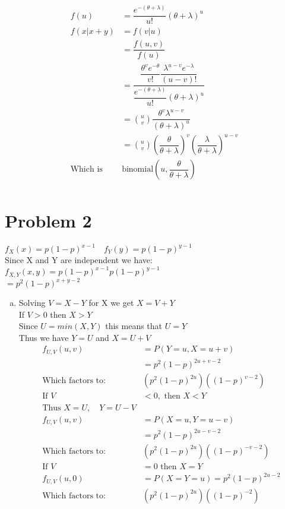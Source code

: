 \documentclass{article}
\begin{document}
\begin{flushleft}
\begin{align*}
f(u)&=\dfrac{e^{-(\theta+\lambda)}}{u!}(\theta+\lambda)^u\\
f(x|x+y)&= f(v|u)\\
&=\dfrac{f(u,v)}{f(u)}\\
&=\dfrac{\dfrac{\theta^v e^{-\theta}}{v!} \dfrac{\lambda^{u-v} e^{-\lambda}}{(u-v)!}}{\dfrac{e^{-(\theta+\lambda)}}{u!}(\theta+\lambda)^u}\\
&={u \choose v}\dfrac{\theta^v \lambda^{u-v}}{(\theta+\lambda)^u}\\
&={u \choose v}\left(\dfrac{\theta}{\theta+\lambda}\right)^{v} \left(\dfrac{\lambda}{\theta+\lambda}\right)^{u-v}\\
\text{Which is }& \text{binomial}\left(u,\dfrac{\theta}{\theta+\lambda}\right)\\
\end{align*}
\section*{Problem 2}
$f_X(x)=p(1-p)^{x-1} \quad f_Y(y)=p(1-p)^{y-1}$\\
Since X and Y are independent we have:\\
$f_{X,Y}(x,y)=p(1-p)^{x-1}p(1-p)^{y-1}$\\
$=p^2(1-p)^{x+y-2}$\\
\begin{enumerate}[(a)]
\item 
Solving $V=X-Y$ for X we get $X=V+Y$\\ 
If $V>0$ then $X>Y$\\
Since $U=min(X,Y)$ this means that $U=Y$\\
Thus we have $Y=U$ and $X=U+V$
\begin{align*}
f_{U,V}(u,v)&=P(Y=u,X=u+v)\\
&=p^2(1-p)^{2u+v-2}\\
\text{Which factors to: }& (p^2(1-p)^{2u})((1-p)^{v-2})\\
\text{If } V&<0, \text{ then } X<Y\\
\text{Thus } X=U, \quad Y=U-V\\
f_{U,V}(u,v)&=P(X=u,Y=u-v)\\
&=p^2(1-p)^{2u-v-2}\\
\text{Which factors to: }& (p^2(1-p)^{2u})((1-p)^{-v-2})\\
\text{If } V&=0 \text{ then } X=Y\\
f_{U,V}(u,0)&=P(X=Y=u)=p^2(1-p)^{2u-2}\\
\text{Which factors to: }& (p^2(1-p)^{2u})((1-p)^{-2})\\

\end{align*}
\end{enumerate}
\end{flushleft}
\end{document}
